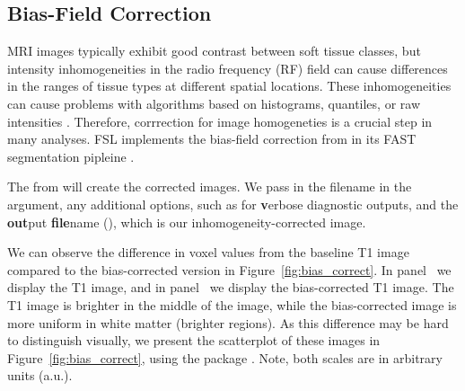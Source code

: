 \subsection{Bias-Field Correction}

MRI images typically exhibit good contrast between soft tissue classes, but intensity inhomogeneities in the radio frequency (RF) field can cause differences in the ranges of tissue types at different spatial locations.  These inhomogeneities can cause problems with algorithms based on histograms, quantiles, or raw intensities \citep{zhang_segmentation_2001}.  Therefore, corrrection for image homogeneties is a crucial step in many analyses.  FSL implements the bias-field correction from \citet{guillemaud_estimating_1997} in its FAST segmentation pipleine \citep{zhang_segmentation_2001}.  
 






The  from  will create the corrected images.  We pass in the filename in the  argument, any additional options, such as  for {\bf v}erbose diagnostic outputs, and the {\bf out}put {\bf file}name (), which is our inhomogeneity-corrected image.



\begin{knitrout}
\color{fgcolor}\begin{kframe}
\begin{alltt}
\hlstd{(} \hlstd{=} \hlstd{,}
                \hlstd{=} \hlstd{,}
                \hlstd{=} \hlstd{)}
\end{alltt}
\end{kframe}
\end{knitrout}




We can observe the difference in voxel values from the baseline T1 image compared to the bias-corrected version in Figure~\ref{fig:bias_correct}.  In panel~\protect{} we display the T1 image, and in panel~\protect{} we display the bias-corrected T1 image.  The T1 image is brighter in the middle of the image, while the bias-corrected image is more uniform in white matter (brighter regions).  As this difference may be hard to distinguish visually, we present the scatterplot of these images in Figure~\ref{fig:bias_correct}\protect{}, using the  package \citep{wickham_ggplot2:_2009}.  Note, both scales are in arbitrary units (a.u.).


